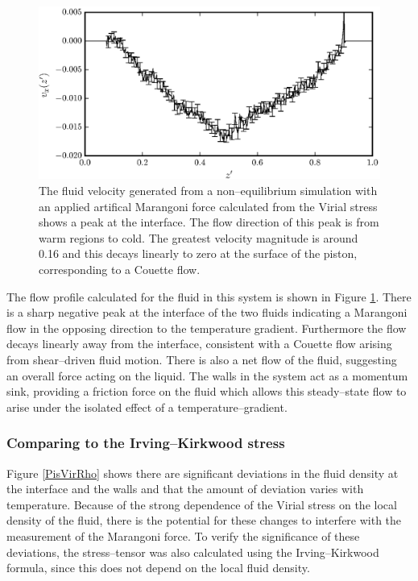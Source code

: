 \begin{figure}[h]
\centering
\includegraphics[scale=0.8]{PisVirFlow}
\caption{The fluid velocity generated from a non--equilibrium simulation with an applied artifical Marangoni force calculated from the Virial stress shows a peak at the interface.
The flow direction of this peak is from warm regions to cold.
The greatest velocity magnitude is around 0.16 and this decays linearly to zero at the surface of the piston, corresponding to a Couette flow.}
\label{PisVirFlow}
\end{figure}
The flow profile calculated for the fluid in this system is shown in Figure \ref{PisVirFlow}. 
There is a sharp negative peak at the interface of the two fluids indicating a Marangoni flow in the opposing direction to the temperature gradient.
Furthermore the flow decays linearly away from the interface, consistent with a Couette flow arising from shear--driven fluid motion.\cite{FluidMech}
There is also a net flow of the fluid, suggesting an overall force acting on the liquid.
The walls in the system act as a momentum sink, providing a friction force on the fluid which allows this steady--state flow to arise under the isolated effect of a temperature--gradient.
\FloatBarrier

\subsubsection{Comparing to the Irving--Kirkwood stress}
Figure \ref{PisVirRho} shows there are significant deviations in the fluid density at the interface and the walls and that the amount of deviation varies with temperature.
Because of the strong dependence of the Virial stress on the local density of the fluid, there is the potential for these changes to interfere with the measurement of the Marangoni force.
To verify the significance of these deviations, the stress--tensor was also calculated using the Irving--Kirkwood formula, since this does not depend on the local fluid density.

